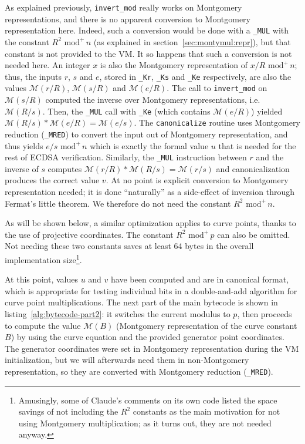 \documentclass{llncs}
\newcommand{\umod}[2]{#1 \,\,\text{mod}^{+}\, #2}
\newcommand{\mont}[1]{\mathcal{M}(#1)}
\begin{document}
As explained previously, \verb+invert_mod+ really works on Montgomery
representations, and there is no apparent conversion to Montgomery
representation here. Indeed, such a conversion would be done with a
\verb+_MUL+ with the constant $\umod{R^2}{n}$ (as explained in
section~\ref{sec:montymul:repr}), but that constant is not provided to
the VM. It so happens that such a conversion is not needed here. An
integer $x$ is also the Montgomery representation of $\umod{x/R}{n}$;
thus, the inputs $r$, $s$ and $e$, stored in \verb+_Kr+, \verb+_Ks+ and
\verb+_Ke+ respectively, are also the values $\mont{r/R}$, $\mont{s/R}$
and $\mont{e/R}$. The call to \verb+invert_mod+ on $\mont{s/R}$ computed
the inverse over Montgomery representations, i.e. $\mont{R/s}$. Then,
the \verb+_MUL+ call with \verb+_Ke+ (which contains $\mont{e/R}$)
yielded $\mont{R/s} * \mont{e/R} = \mont{e/s}$. The \verb+canonicalize+
routine uses Montgomery reduction (\verb+_MRED+) to convert the input
out of Montgomery representation, and thus yields $\umod{e/s}{n}$ which
is exactly the formal value $u$ that is needed for the rest of ECDSA
verification. Similarly, the \verb+_MUL+ instruction between $r$ and
the inverse of $s$ computes $\mont{r/R} * \mont{R/s} = \mont{r/s}$ and
canonicalization produces the correct value $v$. At no point is explicit
conversion to Montgomery representation needed; it is done ``naturally''
as a side-effect of inversion through Fermat's little theorem. We
therefore do not need the constant $\umod{R^2}{n}$.

As will be shown below, a similar optimization applies to curve points,
thanks to the use of projective coordinates. The constant
$\umod{R^2}{p}$ can also be omitted. Not needing these two constants
saves at least 64 bytes in the overall implementation
size\footnote{Amusingly, some of Claude's comments on its own code
listed the space savings of not including the $R^2$ constants as the
main motivation for not using Montgomery multiplication; as it turns
out, they are not needed anyway.}.

At this point, values $u$ and $v$ have been computed and are in
canonical format, which is appropriate for testing individual bits in a
double-and-add algorithm for curve point multiplications. The next part
of the main bytecode is shown in listing~\ref{alg:bytecode-part2}: it
switches the current modulus to $p$, then proceeds to compute the value
$\mont{B}$ (Montgomery representation of the curve constant $B$) by
using the curve equation and the provided generator point coordinates.
The generator coordinates were set in Montgomery representation during
the VM initialization, but we will afterwards need them in
non-Montgomery representation, so they are converted with Montgomery
reduction (\verb+_MRED+).
\end{document}
